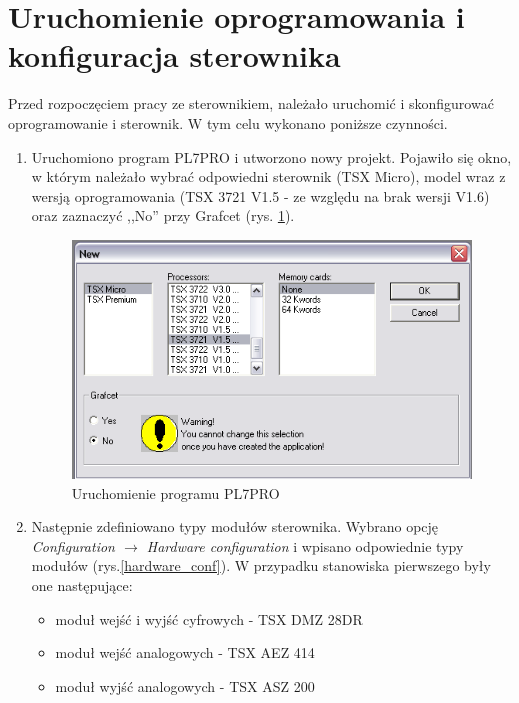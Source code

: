 \documentclass[12pt]{article}
\begin{document}
\section{Uruchomienie oprogramowania i konfiguracja sterownika}
Przed rozpoczęciem pracy ze sterownikiem, należało uruchomić i skonfigurować oprogramowanie
i sterownik. W tym celu wykonano poniższe czynności.
\begin{enumerate}
    \item Uruchomiono program PL7PRO i utworzono nowy projekt. Pojawiło się okno, w którym należało wybrać odpowiedni sterownik (TSX Micro), model wraz z wersją oprogramowania (TSX
    3721 V1.5 - ze względu na brak wersji V1.6) oraz zaznaczyć ,,No'' przy Grafcet (rys. \ref{konfiguracja1}).
    \begin{figure}[H]
        \centering
        \includegraphics[scale=0.8]{./zdjecia/konfiguracja.png}
        \caption{Uruchomienie programu PL7PRO}
        \label{konfiguracja1}
    \end{figure}
    \item Następnie zdefiniowano typy modułów sterownika. Wybrano opcję \textit{Configuration $ \rightarrow $ Hardware configuration} i wpisano odpowiednie typy modułów (rys.\ref{hardware_conf}). W przypadku stanowiska pierwszego były one następujące: 
    \begin{itemize}
        \item moduł wejść i wyjść cyfrowych - TSX DMZ 28DR
        \item moduł wejść analogowych - TSX AEZ 414
        \item moduł wyjść analogowych - TSX ASZ 200
    \end{itemize}
    \begin{figure}[H]
        \centering

\end{figure}
\end{enumerate}
\end{document}
